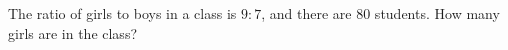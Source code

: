 The ratio of girls to boys in a class is $9:7$, and there are $80$ students. How many girls are in the class?
